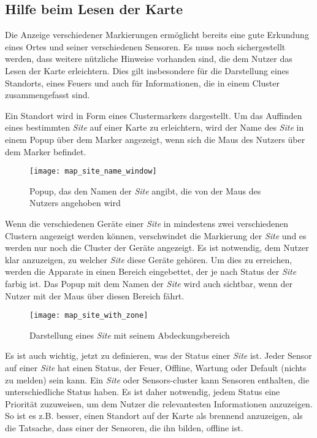 \subsection{Hilfe beim Lesen der Karte}

Die Anzeige verschiedener Markierungen ermöglicht bereits eine gute Erkundung eines Ortes und seiner verschiedenen Sensoren.
Es muss noch sichergestellt werden, dass weitere nützliche Hinweise vorhanden sind, die dem Nutzer das Lesen der Karte erleichtern.
Dies gilt insbesondere für die Darstellung eines Standorts, eines Feuers und auch für Informationen, die in einem Cluster zusammengefasst sind.

Ein Standort wird in Form eines Clustermarkers dargestellt.
Um das Auffinden eines bestimmten \textit{Site} auf einer Karte zu erleichtern, wird der Name des \textit{Site} in einem Popup über dem Marker angezeigt, wenn sich die Maus des Nutzers über dem Marker befindet.

\begin{figure}[H]
  \centering
  \texttt{[image: map\_site\_name\_window]}
  \caption{Popup, das den Namen der \textit{Site} angibt, die von der Maus des Nutzers angehoben wird}
  \label{fig:map_site_name_window}
\end{figure}

Wenn die verschiedenen Geräte einer \textit{Site} in mindestens zwei verschiedenen Clustern angezeigt werden können, verschwindet die Markierung der \textit{Site} und es werden nur noch die Cluster der Geräte angezeigt.
Es ist notwendig, dem Nutzer klar anzuzeigen, zu welcher \textit{Site} diese Geräte gehören.
Um dies zu erreichen, werden die Apparate in einen Bereich eingebettet, der je nach Status der \textit{Site} farbig ist.
Das Popup mit dem Namen der \textit{Site} wird auch sichtbar, wenn der Nutzer mit der Maus über diesen Bereich fährt.

\begin{figure}[H]
  \centering
  \texttt{[image: map\_site\_with\_zone]}
  \caption{Darstellung eines \textit{Site} mit seinem Abdeckungsbereich}
  \label{fig:map_site_with_zone}
\end{figure}

Es ist auch wichtig, jetzt zu definieren, was der Status einer \textit{Site} ist.
Jeder Sensor auf einer \textit{Site} hat einen Status, der Feuer, Offline, Wartung oder Default (nichts zu melden) sein kann.
Ein \textit{Site} oder Sensors-cluster kann Sensoren enthalten, die unterschiedliche Status haben.
Es ist daher notwendig, jedem Status eine Priorität zuzuweisen, um dem Nutzer die relevantesten Informationen anzuzeigen.
So ist es z.B. besser, einen Standort auf der Karte als brennend anzuzeigen, als die Tatsache, dass einer der Sensoren, die ihn bilden, offline ist.

